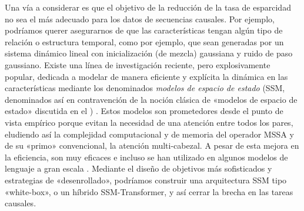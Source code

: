 \documentclass[../../book-main.tex]{subfiles}
\begin{document}
\begin{example}
    Una vía a considerar es que el objetivo de la reducción de la tasa de esparcidad
    no sea el más adecuado para los datos de secuencias causales. Por ejemplo,
    podríamos querer asegurarnos de que las características tengan algún tipo de
    relación o estructura temporal, como por ejemplo, que sean generadas por un
    sistema dinámico lineal con inicialización (de mezcla) gaussiana 
    y ruido de paso gaussiano. Existe una línea de investigación reciente, pero explosivamente
    popular, dedicada a modelar de manera eficiente y explícita
    la dinámica en las características mediante los denominados \textit{modelos de espacio de estado}
    (SSM, denominados así en contravención de la noción clásica
    de «modelos de espacio de estado» discutida en el )
    \citep{gu2024mamba,yang2024parallelizing,yang2024gated}. Estos
    modelos son prometedores desde el punto de vista empírico porque evitan la necesidad de
    una atención entre todos los pares, eludiendo así la complejidad computacional y de memoria
    del operador MSSA y de su «primo» convencional, la
    atención multi-cabezal. A pesar de esta mejora en la eficiencia, son
    muy eficaces e incluso se han utilizado en algunos modelos de lenguaje a gran escala
    \citep{team2025kimi}. Mediante el diseño de objetivos más
    sofisticados y estrategias de «desenrollado», podríamos
    construir una arquitectura SSM tipo «white-box», o un híbrido SSM-Transformer,
    y así cerrar la brecha en las tareas causales.
\end{example}
\end{document}
